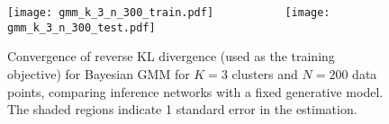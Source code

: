 \begin{figure}[t]
  \centering
  \subcaptionbox{\label{fig:gmm-train}}%
  {\texttt{[image: gmm\_k\_3\_n\_300\_train.pdf]}}
  ~~~~~~~~~~
  \subcaptionbox{\label{fig:gmm-test}}%
  {\texttt{[image: gmm\_k\_3\_n\_300\_test.pdf]}}
  \vspace*{-0.4ex}
	\caption[Simple examples]{Convergence of reverse KL divergence (used as the training objective) for Bayesian GMM for $K=3$ clusters and $N=200$ data points, comparing inference networks with a fixed generative model. The shaded regions indicate 1 standard error in the estimation.
\vspace*{-2.2ex}	}
	\label{fig:gmm}
\end{figure}
